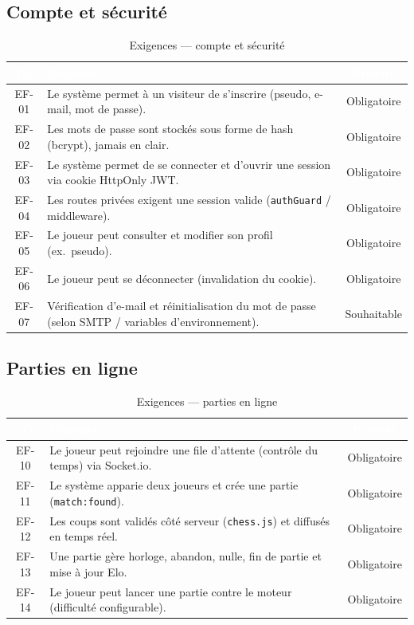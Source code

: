 \documentclass[12pt,a4paper,oneside]{article}
\begin{document}
\subsection{Compte et sécurité}
\begin{table}[H]
\centering
\caption{Exigences --- compte et sécurité}
\small
\begin{tabularx}{\linewidth}{|c|X|c|}
\hline
\rowcolor{sectionblue}
\textcolor{white}{\textbf{ID}} & \textcolor{white}{\textbf{Exigence}} & \textcolor{white}{\textbf{Priorité}} \\
\hline
EF-01 & Le système permet à un visiteur de s'inscrire (pseudo, e-mail, mot de passe). & Obligatoire \\
\hline
EF-02 & Les mots de passe sont stockés sous forme de hash (bcrypt), jamais en clair. & Obligatoire \\
\hline
EF-03 & Le système permet de se connecter et d'ouvrir une session via cookie HttpOnly JWT. & Obligatoire \\
\hline
EF-04 & Les routes privées exigent une session valide (\texttt{authGuard} / middleware). & Obligatoire \\
\hline
EF-05 & Le joueur peut consulter et modifier son profil (ex.\ pseudo). & Obligatoire \\
\hline
EF-06 & Le joueur peut se déconnecter (invalidation du cookie). & Obligatoire \\
\hline
EF-07 & Vérification d'e-mail et réinitialisation du mot de passe (selon SMTP / variables d'environnement). & Souhaitable \\
\hline
\end{tabularx}
\end{table}

\subsection{Parties en ligne}
\begin{table}[H]
\centering
\caption{Exigences --- parties en ligne}
\small
\begin{tabularx}{\linewidth}{|c|X|c|}
\hline
\rowcolor{sectionblue}
\textcolor{white}{\textbf{ID}} & \textcolor{white}{\textbf{Exigence}} & \textcolor{white}{\textbf{Priorité}} \\
\hline
EF-10 & Le joueur peut rejoindre une file d'attente (contrôle du temps) via Socket.io. & Obligatoire \\
\hline
EF-11 & Le système apparie deux joueurs et crée une partie (\texttt{match:found}). & Obligatoire \\
\hline
EF-12 & Les coups sont validés côté serveur (\texttt{chess.js}) et diffusés en temps réel. & Obligatoire \\
\hline
EF-13 & Une partie gère horloge, abandon, nulle, fin de partie et mise à jour Elo. & Obligatoire \\
\hline
EF-14 & Le joueur peut lancer une partie contre le moteur (difficulté configurable). & Obligatoire \\
\hline
\end{tabularx}
\end{table}
\end{document}
